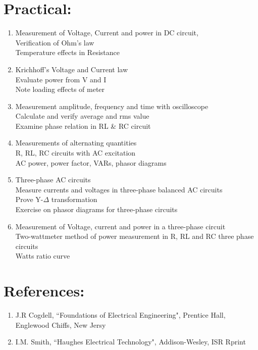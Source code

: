 \section*{Practical:}
\begin{enumerate}
    \item Measurement of Voltage, Current and power in DC circuit, \\
    Verification of Ohm's law \\ Temperature effects in Resistance
    
    \item Krichhoff's Voltage and Current law \\ Evaluate power from V and I \\ Note loading effects of meter
    
    \item Measurement amplitude, frequency and time with oscilloscope \\
    Calculate and verify average and rms value \\ 
    Examine phase relation in RL \& RC circuit
    
    \item Measurements of alternating quantities \\ R, RL, RC circuits with AC excitation \\
    AC power, power factor, VARs, phasor diagrams
    
    \item Three-phase AC circuits \\ Measure currents and voltages in three-phase balanced AC circuits \\ Prove Y-$\Delta$ transformation \\ Exercise on phasor diagrams for three-phase circuits 
    
    \item Measurement of Voltage, current and power in a three-phase circuit \\ Two-wattmeter method of power measurement in R, RL and RC three phase circuits \\ Watts ratio curve 
\end{enumerate}


\section*{References:}
\begin{enumerate}
    \item J.R Cogdell, ``Foundations of Electrical Engineering", Prentice Hall, Englewood Chiffs, New Jersy
    
    \item I.M. Smith, ``Haughes Electrical Technology", Addison-Wesley, ISR Rprint
\end{enumerate}